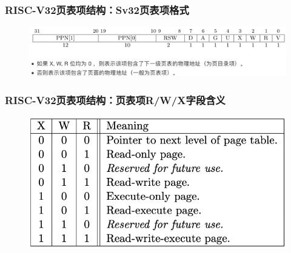 % 
\begin{frame}
    \frametitle{RISC-V32页表项结构：Sv32页表项格式}
        \begin{figure}
        \includegraphics[width=1.0\linewidth]{figs/riscv32-page-entry.png}
        \end{figure}
\end{frame}
\begin{frame}
    \frametitle{RISC-V32页表项结构：页表项R/W/X字段含义}

        \begin{figure}
        \includegraphics[width=0.9\linewidth]{figs/PTE-RWX-fields.png}
        \end{figure}

\end{frame}
% 
% 
% 
% 
